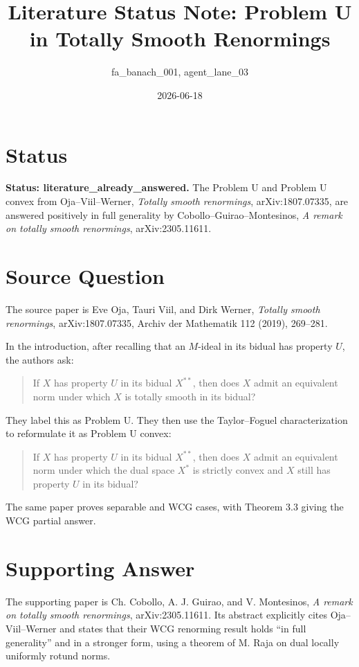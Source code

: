 \documentclass[11pt]{article}
\title{Literature Status Note: Problem U in Totally Smooth Renormings}
\author{fa\_banach\_001, agent\_lane\_03}
\date{2026-06-18}
\begin{document}
\maketitle

\section*{Status}

\textbf{Status: literature\_already\_answered.}
The Problem U and Problem U convex from Oja--Viil--Werner,
\emph{Totally smooth renormings}, arXiv:1807.07335, are answered
positively in full generality by Cobollo--Guirao--Montesinos,
\emph{A remark on totally smooth renormings}, arXiv:2305.11611.

\section*{Source Question}

The source paper is Eve Oja, Tauri Viil, and Dirk Werner,
\emph{Totally smooth renormings}, arXiv:1807.07335, Archiv der
Mathematik 112 (2019), 269--281.

In the introduction, after recalling that an $M$-ideal in its bidual has
property $U$, the authors ask:
\begin{quote}
If $X$ has property $U$ in its bidual $X^{**}$, then does $X$ admit an
equivalent norm under which $X$ is totally smooth in its bidual?
\end{quote}
They label this as Problem U. They then use the Taylor--Foguel
characterization to reformulate it as Problem U convex:
\begin{quote}
If $X$ has property $U$ in its bidual $X^{**}$, then does $X$ admit an
equivalent norm under which the dual space $X^*$ is strictly convex and
$X$ still has property $U$ in its bidual?
\end{quote}
The same paper proves separable and WCG cases, with Theorem 3.3 giving
the WCG partial answer.

\section*{Supporting Answer}

The supporting paper is Ch. Cobollo, A. J. Guirao, and V. Montesinos,
\emph{A remark on totally smooth renormings}, arXiv:2305.11611. Its
abstract explicitly cites Oja--Viil--Werner and states that their WCG
renorming result holds ``in full generality'' and in a stronger form,
using a theorem of M. Raja on dual locally uniformly rotund norms.
\end{document}
